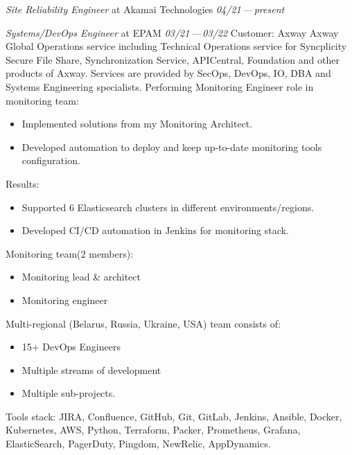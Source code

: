 \documentclass[11pt]{letter}
\newcommand{\forceindent}{\leavevmode{\parindent=1em\indent} %
}
\begin{document}
\begin{etaremune}[
  topsep=1ex,itemsep=1.5ex,partopsep=0ex,
  parsep=0ex,rightmargin=1em,leftmargin=2em
]
  \item
    \emph{Site Reliability Engineer}\hfill
    at Akamai Technologies\hspace{10em}
    \textit{04/21\,—\,present}\vspace{1em}\newline
  \item
    \emph{Systems/DevOps Engineer}\hfill
    at EPAM\hspace{14em}
    \textit{03/21\,—\,03/22}\vspace{1em}\newline
    \forceindent Customer: Axway\vspace{0.5em}\newline
    \forceindent Axway Global Operations service including Technical Operations service for Syncplicity Secure File Share,  Synchronization Service,  APICentral, Foundation and other products of Axway. Services are provided by SecOps, DevOps, IO, DBA and Systems Engineering specialists.\vspace{0.5em}\newline
    \forceindent Performing Monitoring Engineer role in monitoring team: \begin{itemize}
        \item Implemented solutions from my Monitoring Architect. \\
        \item Developed automation to deploy and keep up-to-date monitoring tools configuration. \\
    \end{itemize}
    \forceindent Results: \begin{itemize}
        \item Supported 6 Elasticsearch clusters in different environments/regions.
        \item Developed CI/CD automation in Jenkins for monitoring stack.
    \end{itemize}
     \forceindent Monitoring team(2 members): \begin{itemize}
        \item Monitoring lead \& architect \\
        \item Monitoring engineer
    \end{itemize}

    \forceindent Multi-regional (Belarus, Russia, Ukraine, USA) team consists of: \begin{itemize}
        \item 15+ DevOps Engineers
        \item Multiple streams of development
        \item Multiple sub-projects.
    \end{itemize}
    \forceindent Tools stack: JIRA, Confluence, GitHub, Git, GitLab, Jenkins, Ansible, Docker, Kubernetes, AWS, Python, Terraform,  Packer,  Prometheus, Grafana, ElasticSearch, PagerDuty, Pingdom, NewRelic, AppDynamics.


\end{etaremune}
\end{document}

